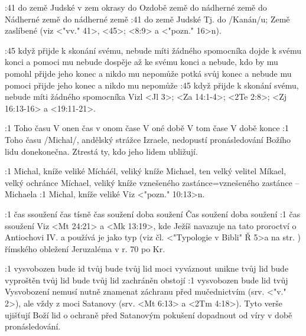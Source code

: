 :41  
    {do země Judské}   %
    {v zem okrasy}   %
    {do Ozdobě země}   %
    {do nádherné země}   %
    {do Nádherné země}   %
    {do nádherné země}   %
:41 {do země Judské}
    Tj. do \x/Kanán/u;  Země zaslíbené (viz <"vv." 41>, <45>; <8:9> a <"pozn." 16>n).


:45  
    {když přijde k skonání svému, nebude míti žádného spomocníka}   %
    {dojde k svému konci a pomoci mu nebude}   %
    {dospěje až ke svému konci a nebude, kdo by mu pomohl}   %
    {přijde jeho konec a nikdo mu nepomůže}   %
    {potká svůj konec a nebude mu pomoci}   %
    {přijde jeho konec a nikdo mu nepomůže}   %
:45 {když přijde k skonání svému, nebude míti žádného spomocníka}  
    Vizl <Jl 3>;  <Za 14:1-4>; <2Te 2:8>;  <Zj 16:13-16> a <19:11-21>.
    
    

:1  
    {Toho času}   %
    {V onen čas}   %
    {v onom čase}   %
    {V oné době}   %
    {V tom čase}   %
    {V době konce}   %
:1 {Toho času} \x/Michal/, andělský strážce Izraele, nedopustí pronásledování Božího lidu donekonečna. Ztrestá ty, kdo jeho lidem ubližují. 


:1  
    {Michal, kníže veliké}  %
    {Mícháél, veliký kníže} %
    {Michael, ten velký velitel}  %
    {Míkael, velký ochránce} %
    {Míchael, veliký kníže}  %
    {vznešeného zastánce}={vznešeného zastánce -- Michaela}  %
:1 {Michal, kníže veliké} Viz <"pozn." 10:13>n.

:1  
    {čas ssoužení}  %
    {čas tísně} %
    {čas soužení}  %
    {doba soužení} %
    {Čas soužení}  %
    {doba soužení}  %
:1 {čas ssoužení} 
      Viz <Mt 24:21> a <Mk 13:19>, kde Ježíš navazuje na tato proroctví o Antiochovi IV. a používá je jako typ (viz čl. <"Typologie v Bibli" Ř 5>a na str. \pg) římského obležení Jeruzaléma v r. 70 po Kr. 
      
:1  
    {vysvobozen bude id tvůj}  %
    {bude tvůj lid moci vyváznout} %
    {unikne tvůj lid}  %
    {bude vyproštěn tvůj lid} %
    {bude tvůj lid zachráněn}  %
    {obstojí}  %
:1 {vysvobozen bude lid tvůj} Vysvobození nemusí nutně znamenat záchranu před  mučednictvím (srv. <"v." 2>), ale vždy z moci Satanovy (srv. <Mt 6:13> a <2Tm 4:18>). Tyto verše ujišťují Boží lid o ochraně před Satanovým pokušení dopadnout od víry v době pronásledování. 

